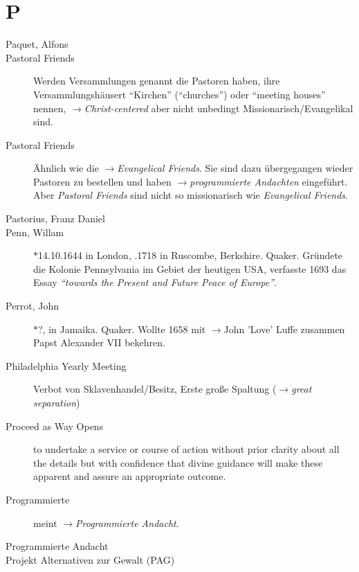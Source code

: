 \section*{P}

\articlesize

\begin{description}

 \item[Paquet, Alfons]

 \item[Pastoral Friends] Werden Versammlungen genannt die Pastoren haben, ihre
 Versammlungshäusert "`Kirchen"' ("`churches"') oder "`meeting houses"' nennen,
 $\to$\textit{Christ-centered} aber nicht unbedingt Missionarisch/Evangelikal
 sind. 

 \item[Pastoral Friends] Ähnlich wie die $\to$\textit{Evangelical Friends}. Sie
 sind dazu übergegangen wieder Pastoren zu bestellen und haben
 $\to$\textit{programmierte Andachten} eingeführt. Aber \textit{Pastoral
 Friends} sind nicht so missionarisch wie \textit{Evangelical Friends}.

 \item[Pastorius, Franz Daniel]

 \item[Penn, Willam] $\ast$14.10.1644 in London, .1718 in Ruscombe,
 Berkshire. Quaker. Gründete die Kolonie Pennsylvania im Gebiet der heutigen
 USA, verfasste 1693 das Essay \textit{"`towards the Present and Future Peace
 of Europe"'}.

 \item[Perrot, John] $\ast$?,  in Jamaika. Quaker. Wollte 1658 mit
 $\to$John 'Love' Luffe zusammen Papst Alexander VII bekehren.

  \item[Philadelphia Yearly Meeting] Verbot von Sklavenhandel/Besitz, Erste
  große Spaltung ($\to$\textit{great separation})

  \item[Proceed as Way Opens]
    to undertake a service or course of action without prior clarity about all the details but with confidence that divine guidance will make these apparent and assure an appropriate outcome.

 \item[Programmierte] meint $\to$\textit{Programmierte Andacht}.

 \item[Programmierte Andacht]

 \item[Projekt Alternativen zur Gewalt (PAG)]

 \end{description}
\normalsize


